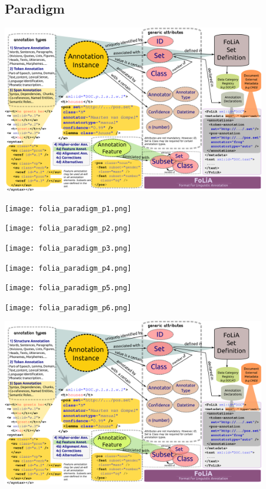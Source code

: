 \documentclass[compress]{beamer}
\begin{document}
\subsection{Paradigm}

\begin{frame}
        \includegraphics[width=115.0mm]{folia_paradigm.png}
\end{frame}


\begin{frame}
        \texttt{[image: folia\_paradigm\_p1.png]}
\end{frame}


\begin{frame}
        \texttt{[image: folia\_paradigm\_p2.png]}
\end{frame}

\begin{frame}
        \texttt{[image: folia\_paradigm\_p3.png]}
\end{frame}

\begin{frame}
        \texttt{[image: folia\_paradigm\_p4.png]}
\end{frame}

\begin{frame}
        \texttt{[image: folia\_paradigm\_p5.png]}
\end{frame}

\begin{frame}
        \texttt{[image: folia\_paradigm\_p6.png]}
\end{frame}

\begin{frame}
        \includegraphics[width=115.0mm]{folia_paradigm.png}
\end{frame}
\end{document}
